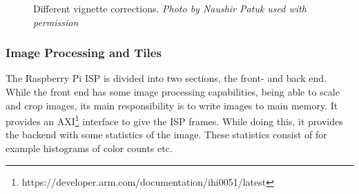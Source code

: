 \begin{figure}[htpb]
    \centering
    \qquad

    \caption{Different vignette corrections. \textit{Photo by Naushir Patuk used with permission}}\label{fig:lens_shading}
\end{figure}

\subsubsection{Image Processing and Tiles}
The Raspberry Pi ISP is divided into two sections, the front- and back end.
While the front end has some image processing capabilities, being able to scale
and crop images, its main responsibility is to write images to main memory.
It provides an AXI\footnote{https://developer.arm.com/documentation/ihi0051/latest}
interface to give the ISP frames. While doing this, it provides the backend
with some statistics of the image. These statistics consist of for example
histograms of color counts etc.


